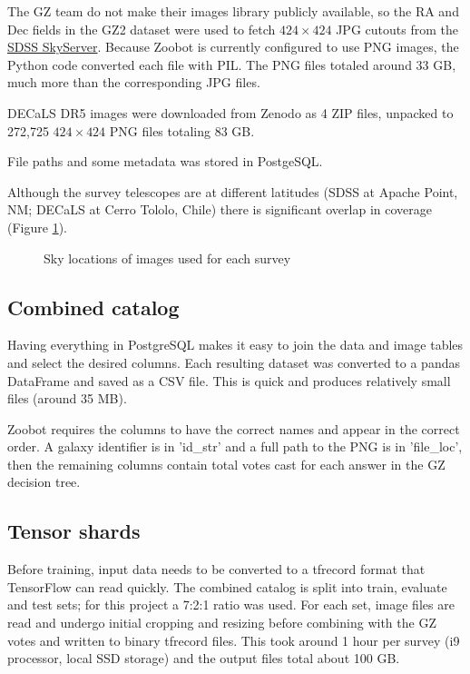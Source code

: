 \documentclass[preprint]{aastex631}
\begin{document}
The GZ team do not make their images library publicly available, so the RA and Dec fields in the GZ2 dataset were used to fetch $424 \times 424$ JPG cutouts from the \href{http://skyserver.sdss.org/dr14/SkyServerWS/ImgCutout/getjpeg}{SDSS SkyServer}. Because Zoobot is currently configured to use PNG images, the Python code converted each file with PIL. The PNG files totaled around 33 GB, much more than the corresponding JPG files.

DECaLS DR5 images were downloaded from Zenodo \citep{walmsley_mike_2020_4573248} as 4 ZIP files, unpacked to 272,725 $424 \times 424$ PNG files totaling 83 GB. 

File paths and some metadata was stored in PostgeSQL.

Although the survey telescopes are at different latitudes (SDSS at Apache Point, NM; DECaLS at Cerro Tololo, Chile) there is significant overlap in coverage (Figure \ref{fig:coverage}).

\begin{figure}[htb!]
	\caption{Sky locations of images used for each survey
		\label{fig:coverage}}
\end{figure}



\subsection{Combined catalog}

Having everything in PostgreSQL makes it easy to join the data and image tables and select the desired columns. Each resulting dataset was converted to a pandas DataFrame and saved as a CSV file. This is quick and produces relatively small files (around 35 MB).

Zoobot requires the columns to have the correct names and appear in the correct order. A galaxy identifier is in 'id\_str' and a full path to the PNG is in 'file\_loc', then the remaining columns contain total votes cast for each answer in the GZ decision tree.

\subsection{Tensor shards}

Before training, input data needs to be converted to a tfrecord format that TensorFlow can read quickly. The combined catalog is split into train, evaluate and test sets; for this project a 7:2:1 ratio was used. For each set, image files are read and undergo initial cropping and resizing before combining with the GZ votes and written to binary tfrecord files. This took around 1 hour per survey (i9 processor, local SSD storage) and the output files total about 100 GB.
\end{document}
